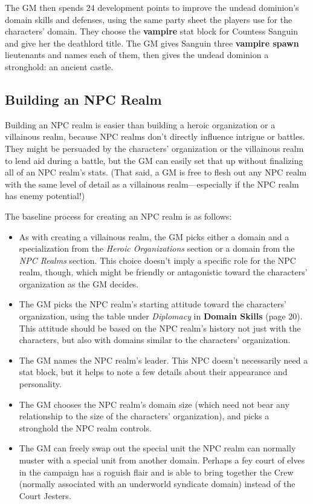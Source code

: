 \documentclass[10pt,a4paper,twoside,bg=print,twocolumn,openany,nodeprecatedcode]{dndbook}
\begin{document}
The GM then spends 24 development points to improve the undead dominion's domain skills and defenses, using the same party sheet the players use for the characters' domain. They choose the \textbf{vampire} stat block for Countess Sanguin and give her the deathlord title. The GM gives Sanguin three \textbf{vampire spawn} lieutenants and names each of them, then gives the undead dominion a stronghold: an ancient castle.

\subsection{Building an NPC Realm}
Building an NPC realm is easier than building a heroic organization or a villainous realm, because NPC realms don't directly influence intrigue or battles. They might be persuaded by the characters' organization or the villainous realm to lend aid during a battle, but the GM can easily set that up without finalizing all of an NPC realm's stats. (That said, a GM is free to flesh out any NPC realm with the same level of detail as a villainous realm—especially if the NPC realm has enemy potential!)

The baseline process for creating an NPC realm is as follows:


\begin{itemize}
\item As with creating a villainous realm, the GM picks either a domain and a specialization from the \textit{Heroic Organizations} section or a domain from the \textit{NPC Realms} section. This choice doesn't imply a specific role for the NPC realm, though, which might be friendly or antagonistic toward the characters' organization as the GM decides.
\item The GM picks the NPC realm's starting attitude toward the characters' organization, using the table under \textit{Diplomacy} in \textbf{Domain Skills} (page 20). This attitude should be based on the NPC realm's history not just with the characters, but also with domains similar to the characters' organization.
\item The GM names the NPC realm's leader. This NPC doesn't necessarily need a stat block, but it helps to note a few details about their appearance and personality.
\item The GM chooses the NPC realm's domain size (which need not bear any relationship to the size of the characters' organization), and picks a stronghold the NPC realm controls.
\item The GM can freely swap out the special unit the NPC realm can normally muster with a special unit from another domain. Perhaps a fey court of elves in the campaign has a roguish flair and is able to bring together the Crew (normally associated with an underworld syndicate domain) instead of the Court Jesters.
\end{itemize}
\end{document}
